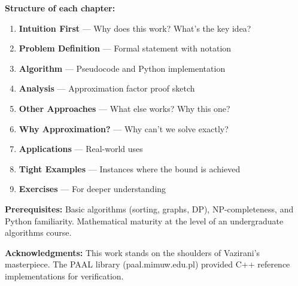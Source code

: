 \documentclass[11pt,oneside]{book}
\begin{document}
\vspace{1em}

\noindent \textbf{Structure of each chapter:}
\begin{enumerate}
    \item \textbf{Intuition First} — Why does this work? What's the key idea?
    \item \textbf{Problem Definition} — Formal statement with notation
    \item \textbf{Algorithm} — Pseudocode and Python implementation
    \item \textbf{Analysis} — Approximation factor proof sketch
    \item \textbf{Other Approaches} — What else works? Why this one?
    \item \textbf{Why Approximation?} — Why can't we solve exactly?
    \item \textbf{Applications} — Real-world uses
    \item \textbf{Tight Examples} — Instances where the bound is achieved
    \item \textbf{Exercises} — For deeper understanding
\end{enumerate}

\vspace{1em}

\noindent \textbf{Prerequisites:} Basic algorithms (sorting, graphs, DP), NP-completeness, and Python familiarity. Mathematical maturity at the level of an undergraduate algorithms course.

\vspace{1em}

\noindent \textbf{Acknowledgments:} This work stands on the shoulders of Vazirani's masterpiece. The PAAL library (paal.mimuw.edu.pl) provided C++ reference implementations for verification.

\tableofcontents

\mainmatter
































\end{document}
